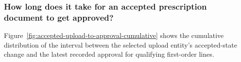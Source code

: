 \subsubsection{How long does it take for an accepted prescription document to get approved?}
\label{subsec:approval-analysis}
Figure~\ref{fig:accepted-upload-to-approval-cumulative} shows the cumulative
distribution of the interval between the selected upload entity's accepted-state
change and the latest recorded approval for qualifying first-order lines.



\clearpage
\linenumbers



\clearpage
\nolinenumbers

